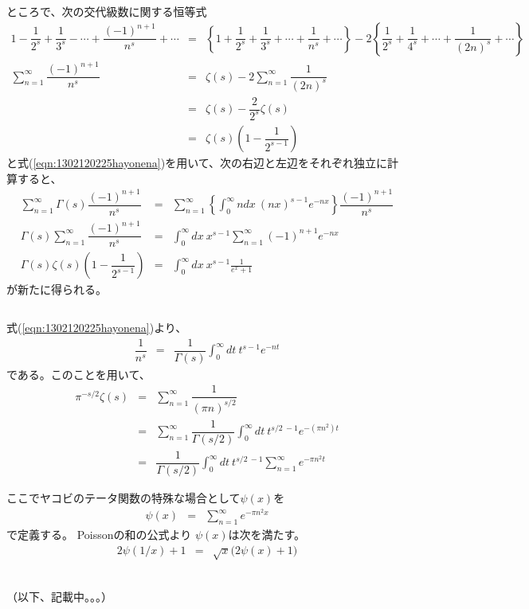 \documentclass[uplatex,a4j,12pt,dvipdfmx]{jsarticle}
\begin{document}
ところで、次の交代級数に関する恒等式
\begin{eqnarray}
	1
	-
	\dfrac{1}{2^{s}}
	+
	\dfrac{1}{3^{s}}
	-
	\cdots
	+
	\dfrac{(-1)^{n+1}}{n^{s}}
	+
	\cdots
	&=&
	\left\{
	1
	+
	\dfrac{1}{2^{s}}
	+
	\dfrac{1}{3^{s}}
	+
	\cdots
	+
	\dfrac{1}{n^{s}}
	+
	\cdots
	\right\}
	-
	2
	\left\{
	\dfrac{1}{2^{s}}
	+
	\dfrac{1}{4^{s}}
	+
	\cdots
	+
	\dfrac{1}{(2n)^{s}}
	+
	\cdots
	\right\}
	\nonumber \\
	\sum_{n=1}^{\infty}
	\dfrac{(-1)^{n+1}}{n^{s}}
	&=&
	\zeta(s)
	-
	2
	\sum_{n=1}^{\infty}
	\dfrac{1}{(2n)^{s}}
	\nonumber \\ &=&
	\zeta(s)
	-
	\dfrac{2}{2^{s}}
	\zeta(s)
	\nonumber \\ &=&
	\zeta(s)
	\left(
	1
	-
	\dfrac{1}{2^{s-1}}
	\right)
\end{eqnarray}
と式(\ref{eqn:1302120225hayonena})を用いて、次の右辺と左辺をそれぞれ独立に計算すると、
\begin{eqnarray}
	\sum_{n=1}^{\infty}
	\Gamma(s)
	\dfrac{(-1)^{n+1}}{n^{s}}
	&=&
	\sum_{n=1}^{\infty}
	\left\{
	\int^{\infty}_{0}
	\!\! ndx
	\ \! (nx)^{s-1} e^{-nx}
	\right\}
	\dfrac{(-1)^{n+1}}{n^{s}}
	\nonumber \\
	\Gamma(s)
	\sum_{n=1}^{\infty}
	\dfrac{(-1)^{n+1}}{n^{s}}
	&=&
	\int^{\infty}_{0}
	\!\! dx
	\ \! x^{s-1}
	\sum_{n=1}^{\infty}
	(-1)^{n+1}
	e^{-nx}
	\nonumber \\
	\Gamma(s)
	\zeta(s)
	\left(
	1
	-
	\dfrac{1}{2^{s-1}}
	\right)
	&=&
	\int^{\infty}_{0}
	\!\! dx
	\ \! x^{s-1}
	\frac{1}{e^{x} + 1}
\end{eqnarray}
が新たに得られる。

${}$

式(\ref{eqn:1302120225hayonena})より、
\begin{eqnarray}
	\dfrac{1}{n^{s}}
	&=&
	\dfrac{1}{\Gamma(s)}
	\int^{\infty}_{0}
	dt \ \! t^{s-1} e^{-nt}
\end{eqnarray}
である。このことを用いて、
\begin{eqnarray}
	\pi^{-s/2}
	\zeta(s)
	&=&
	\sum_{n=1}^{\infty}
	\dfrac{1}{(\pi n )^{s/2}}
	\nonumber \\ &=&
	\sum_{n=1}^{\infty}
	\dfrac{1}{\Gamma(s/2)}
	\int^{\infty}_{0}
	dt \ \! t^{s/2 \ \! -1} e^{-(\pi n^{2})t}
	\nonumber \\ &=&
	\dfrac{1}{\Gamma(s/2)}
	\int^{\infty}_{0}
	dt \ \! t^{s/2 \ \! -1}
	\sum_{n=1}^{\infty}
	e^{- \pi n^{2} t}
\end{eqnarray}

ここでヤコビのテータ関数の特殊な場合として$\psi(x)$を
\begin{eqnarray}
	\psi(x)
	&=&
	\sum_{n=1}^{\infty}
	e^{- \pi n^{2} x}
\end{eqnarray}
で定義する。
Poissonの和の公式より
$\psi(x)$は次を満たす。
\begin{eqnarray}
	2 \psi ( 1/x )
	+
	1
	&=&
	\sqrt{x}
	\Big( 2 \psi(x) + 1 \Big)
\end{eqnarray}

\ \\

（以下、記載中。。。）
\end{document}
